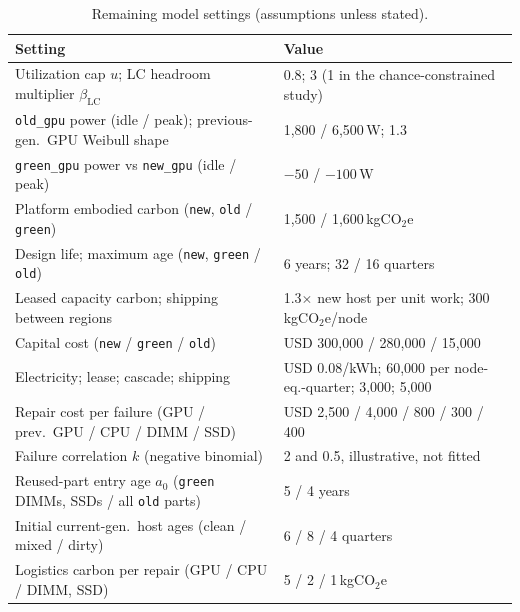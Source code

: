 \documentclass[11pt]{article}
\begin{document}
\begin{table}[!htbp]
  \centering
  \caption{Remaining model settings (assumptions unless stated).}
  \label{tab:params}
  \small
  \begin{tabular}{ll}
    \toprule
    Setting & Value \\
    \midrule
    Utilization cap $u$; LC headroom multiplier $\beta_{\text{LC}}$ & 0.8; 3 (1 in the chance-constrained study) \\
    \texttt{old\_gpu} power (idle / peak); previous-gen.\ GPU Weibull shape & 1{,}800 / 6{,}500\,W; 1.3 \\
    \texttt{green\_gpu} power vs \texttt{new\_gpu} (idle / peak) & $-50$ / $-100$\,W \\
    Platform embodied carbon (\texttt{new}, \texttt{old} / \texttt{green}) & 1{,}500 / 1{,}600\,kgCO$_2$e \\
    Design life; maximum age (\texttt{new}, \texttt{green} / \texttt{old}) & 6 years; 32 / 16 quarters \\
    Leased capacity carbon; shipping between regions & 1.3$\times$ new host per unit work; 300\,kgCO$_2$e/node \\
    Capital cost (\texttt{new} / \texttt{green} / \texttt{old}) & USD 300{,}000 / 280{,}000 / 15{,}000 \\
    Electricity; lease; cascade; shipping & USD 0.08/kWh; 60{,}000 per node-eq.-quarter; 3{,}000; 5{,}000 \\
    Repair cost per failure (GPU / prev.\ GPU / CPU / DIMM / SSD) & USD 2{,}500 / 4{,}000 / 800 / 300 / 400 \\
    Failure correlation $k$ (negative binomial) & 2 and 0.5, illustrative, not fitted \\
    Reused-part entry age $a_0$ (\texttt{green} DIMMs, SSDs / all \texttt{old} parts) & 5 / 4 years \\
    Initial current-gen.\ host ages (clean / mixed / dirty) & 6 / 8 / 4 quarters \\
    Logistics carbon per repair (GPU / CPU / DIMM, SSD) & 5 / 2 / 1\,kgCO$_2$e \\
    \bottomrule
  \end{tabular}
\end{table}
\end{document}

